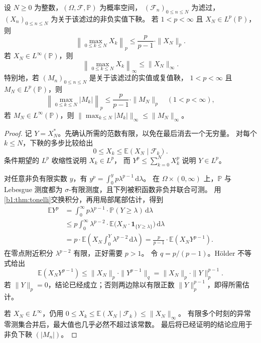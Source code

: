 \begin{theorem}
\label{b1:thm:doob-strong-31}
设 \(N\geq0\) 为整数，\((\Omega,\mathcal F,\mathbb P)\) 为概率空间，
\((\mathcal F_n)_{0\leq n\leq N}\) 为滤过，
\((X_n)_{0\leq n\leq N}\) 为关于该滤过的非负实值下鞅。
若 \(1<p<\infty\) 且 \(X_N\in L^p(\mathbb P)\)，则
\[
 \left\|\max_{0\leq k\leq N}X_k\right\|_p
 \leq\frac p{p-1}\cdot\|X_N\|_p.
\]
若 \(X_N\in L^\infty(\mathbb P)\)，则
\[
 \left\|\max_{0\leq k\leq N}X_k\right\|_\infty
 \leq\|X_N\|_\infty.
\]
特别地，若 \((M_n)_{0\leq n\leq N}\) 是关于该滤过的实值或复值鞅，
\(1<p<\infty\) 且 \(M_N\in L^p(\mathbb P)\)，则
\[
 \left\|\max_{0\leq k\leq N}|M_k|\right\|_p
 \leq\frac p{p-1}\cdot\|M_N\|_p
 \quad(1<p<\infty),
\]
若 \(M_N\in L^\infty(\mathbb P)\)，则
\(\|\max_{k\leq N}|M_k|\|_\infty\leq\|M_N\|_\infty\)。
\end{theorem}
\begin{proof}
记 \(Y=X_N^*\)。先确认所需的范数有限，以免在最后消去一个无穷量。
对每个 \(k\leq N\)，下鞅的多步比较给出
\[
 0\leq X_k\leq\mathbb E(X_N\mid\mathcal F_k).
\]
条件期望的 \(L^p\) 收缩性说明 \(X_k\in L^p\)，
而 \(Y^p\leq\sum_{k=0}^N X_k^p\) 说明 \(Y\in L^p\)。

对任意非负有限实数 \(y\)，有
\(y^p=\int_0^y p\lambda^{p-1}\,\mathrm d\lambda\)。
在 \(\Omega\times(0,\infty)\) 上，\(\mathbb P\) 与 Lebesgue 测度都为
\(\sigma\)-有限测度，且下列被积函数非负并联合可测。
用\cref{b1:thm:tonelli}交换积分，再用局部尾部估计，得到
\[
 \begin{aligned}
 \mathbb E Y^p
 &=\int_0^\infty p\lambda^{p-1}\cdot
                    \mathbb P(Y\geq\lambda)\,\mathrm d\lambda\\
 &\leq p\int_0^\infty\lambda^{p-2}\cdot
        \mathbb E\bigl(X_N\cdot\mathbf1_{\{Y\geq\lambda\}}\bigr)
                          \,\mathrm d\lambda\\
 &=p\cdot\mathbb E\left(X_N\int_0^Y\lambda^{p-2}\,\mathrm d\lambda\right)
 =\frac p{p-1}\cdot\mathbb E(X_NY^{p-1}).
 \end{aligned}
\]
在零点附近积分 \(\lambda^{p-2}\) 有限，正好需要 \(p>1\)。
令 \(q=p/(p-1)\)。Hölder 不等式给出
\[
 \mathbb E(X_NY^{p-1})
 \leq\|X_N\|_p\cdot\|Y^{p-1}\|_q
 =\|X_N\|_p\cdot\|Y\|_p^{p-1}.
\]
若 \(\|Y\|_p=0\)，结论已经成立；否则两边除以有限正数
\(\|Y\|_p^{p-1}\)，即得所需估计。

若 \(X_N\in L^\infty\)，仍用
\(0\leq X_k\leq\mathbb E(X_N\mid\mathcal F_k)\leq\|X_N\|_\infty\)。
有限多个时刻的异常零测集合并后，最大值也几乎必然不超过该常数。
最后将已经证明的结论应用于非负下鞅 \((|M_n|)\)。
\end{proof}


